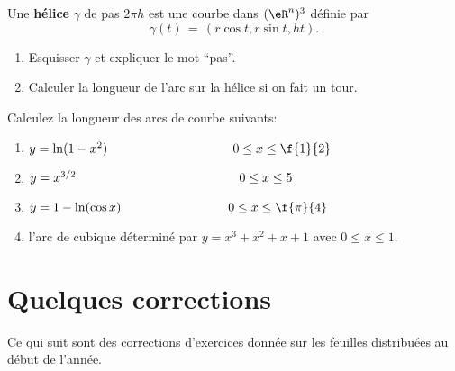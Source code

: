 \exerNico
Une {\bf hélice} $\gamma$ de pas $2 \pi h$ est une courbe dans $(\eR^n)^3$ définie par
$$
	\gamma (t) \,=\, \left( r \cos t , r \sin t , h t \right)  .
$$

\begin{enumerate}
	\item Esquisser $\gamma$ et expliquer le mot ``pas''.

	\item Calculer la longueur de l'arc sur la hélice si on fait un tour.
\end{enumerate}

\exerNico Calculez la longueur des arcs de courbe suivants:
\begin{enumerate}
	\item $y= \ln(1-x^2)  \hspace{3.5cm} 0\leq x\leq \f{1}{2}$
	\item  $y= x^{3/2}  \hspace{4.57cm} 0\leq x\leq 5$
	\item $y = 1-\ln(\cos x) \hspace{3cm} 0\leq x \leq \f{\pi}{4}$
	\item l'arc de cubique déterminé par $y=x^3+x^2+x+1$ avec $0\leq x \leq 1$.
\end{enumerate}


\section{Quelques corrections}

Ce qui suit sont des corrections d'exercices donnée sur les feuilles distribuées au début de l'année.

